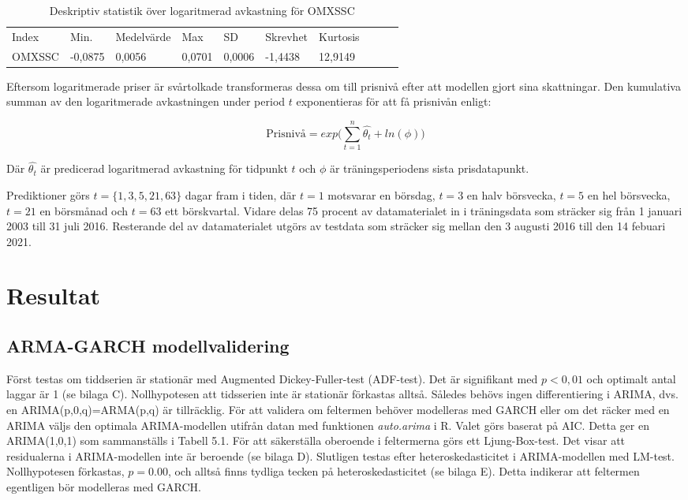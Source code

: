 \documentclass[11pt]{article}
\numberwithin{equation}{section}
\numberwithin{table}{section}
\numberwithin{figure}{section}
\begin{document}
\begin{table}[H]
\caption{Deskriptiv statistik över logaritmerad avkastning för OMXSSC}
\begin{tabular}{@{}llllllllll@{}}
\cmidrule(r){1-7}
%
Index  & Min.    & Medelvärde & Max    & SD     & Skrevhet & Kurtosis \\ \cmidrule(r){1-7}
OMXSSC & -0,0875 & 0,0056     & 0,0701 & 0,0006 & -1,4438  & 12,9149  \\ \cmidrule(r){1-7}
\end{tabular}
\end{table}

Eftersom logaritmerade priser är svårtolkade transformeras dessa om till prisnivå efter att modellen gjort sina skattningar. Den kumulativa summan av den logaritmerade avkastningen under period $t$ exponentieras för att få prisnivån enligt:

\begin{equation}
    \text{Prisnivå} =  exp\Big({\sum\limits_{t=1}^n \hat{\theta_{t}}} + ln(\phi)\Big)
\end{equation}

Där  $\hat{\theta_t}$ är predicerad logaritmerad avkastning för tidpunkt $t$ och $\phi$ är träningsperiodens sista prisdatapunkt. 

Prediktioner görs $t=\{1, 3, 5, 21, 63\}$ dagar fram i tiden, där $t=1$ motsvarar en börsdag,  $t=3$ en halv börsvecka, $t=5$ en hel börsvecka, $t=21$ en börsmånad och $t=63$ ett börskvartal. Vidare delas 75 procent av datamaterialet in i träningsdata som sträcker sig från 1 januari 2003 till 31 juli 2016. Resterande del av datamaterialet utgörs av testdata som sträcker sig mellan den 3 augusti 2016 till den 14 febuari 2021. 

\newpage
\section{Resultat}
\subsection{ARMA-GARCH modellvalidering}
Först testas om tiddserien är stationär med Augmented Dickey-Fuller-test (ADF-test). Det är signifikant med $p<0,01$ och optimalt antal laggar är 1 (se bilaga C). Nollhypotesen att tidsserien inte är stationär förkastas alltså. Således behövs ingen differentiering i ARIMA, dvs. en ARIMA(p,0,q)=ARMA(p,q) är tillräcklig. För att validera om feltermen behöver modelleras med GARCH eller om det räcker med en ARIMA väljs den optimala ARIMA-modellen utifrån datan med funktionen \textit{auto.arima} i R. Valet görs baserat på AIC. Detta ger en ARIMA(1,0,1) som sammanställs i Tabell 5.1. För att säkerställa oberoende i feltermerna görs ett Ljung-Box-test. Det visar att residualerna i ARIMA-modellen inte är beroende (se bilaga D). Slutligen testas efter heteroskedasticitet i ARIMA-modellen med LM-test. Nollhypotesen förkastas, $p=0.00$, och alltså finns tydliga tecken på heteroskedasticitet (se bilaga E). Detta indikerar att feltermen egentligen bör modelleras med GARCH. 
\end{document}
